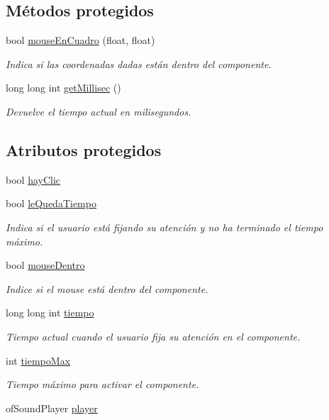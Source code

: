 \subsection*{Métodos protegidos}
\begin{DoxyCompactItemize}
\item 
bool \hyperlink{classcomponente_base_a2ca6628fb724d45687646a364ad68888}{mouse\+En\+Cuadro} (float, float)
\begin{DoxyCompactList}\small\item\em Indica si las coordenadas dadas están dentro del componente. \end{DoxyCompactList}\item 
long long int \hyperlink{classcomponente_base_a72b7c9497aa4af988a91d16446d26c34}{get\+Millisec} ()
\begin{DoxyCompactList}\small\item\em Devuelve el tiempo actual en milisegundos. \end{DoxyCompactList}\end{DoxyCompactItemize}
\subsection*{Atributos protegidos}
\begin{DoxyCompactItemize}
\item 
bool \hyperlink{classcomponente_base_a76a4fa4887545c9222a62d7f4aa7e71a}{hay\+Clic}
\item 
bool \hyperlink{classcomponente_base_ab03e8ff7fb596e34738ba00d455e37f5}{le\+Queda\+Tiempo}
\begin{DoxyCompactList}\small\item\em Indica si el usuario está fijando su atención y no ha terminado el tiempo máximo. \end{DoxyCompactList}\item 
bool \hyperlink{classcomponente_base_a3cd688b2120c9545e25b490911e66717}{mouse\+Dentro}
\begin{DoxyCompactList}\small\item\em Indice si el mouse está dentro del componente. \end{DoxyCompactList}\item 
long long int \hyperlink{classcomponente_base_a6c1aa628629954f831209628e3dfcb2b}{tiempo}
\begin{DoxyCompactList}\small\item\em Tiempo actual cuando el usuario fija su atención en el componente. \end{DoxyCompactList}\item 
int \hyperlink{classcomponente_base_a0edb9230fa502947fd80006463f9ce25}{tiempo\+Max}
\begin{DoxyCompactList}\small\item\em Tiempo máximo para activar el componente. \end{DoxyCompactList}\item 
of\+Sound\+Player \hyperlink{classcomponente_base_aed6af391c3e1381467f804283925ede1}{player}
\end{DoxyCompactItemize}


